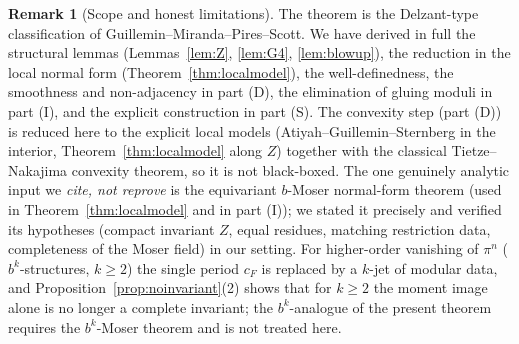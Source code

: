 \documentclass{amsart}
\theoremstyle{definition}
\newtheorem{remark}{Remark}
\begin{document}
\begin{remark}[Scope and honest limitations]
The theorem is the Delzant-type classification of
Guillemin--Miranda--Pires--Scott. We have derived in full the structural
lemmas (Lemmas~\ref{lem:Z}, \ref{lem:G4}, \ref{lem:blowup}), the reduction in
the local normal form (Theorem~\ref{thm:localmodel}), the well-definedness,
the smoothness and non-adjacency in part (D), the elimination of gluing moduli
in part (I), and the explicit construction in part (S). The convexity step (part (D)) is reduced here to the explicit local models
(Atiyah--Guillemin--Sternberg in the interior, Theorem~\ref{thm:localmodel}
along $Z$) together with the classical Tietze--Nakajima convexity theorem, so it
is not black-boxed. The one genuinely analytic input we \emph{cite, not reprove}
is the equivariant $b$-Moser normal-form theorem (used in
Theorem~\ref{thm:localmodel} and in part (I)); we stated it precisely and
verified its hypotheses (compact invariant $Z$, equal residues, matching
restriction data, completeness of the Moser field) in our setting. For higher-order vanishing of $\pi^n$
($b^k$-structures, $k\ge2$) the single period $c_F$ is replaced by a $k$-jet of
modular data, and Proposition~\ref{prop:noinvariant}(2) shows that for $k\ge2$
the moment image alone is no longer a complete invariant; the $b^k$-analogue of
the present theorem requires the $b^k$-Moser theorem and is not treated here.
\end{remark}
\end{document}
